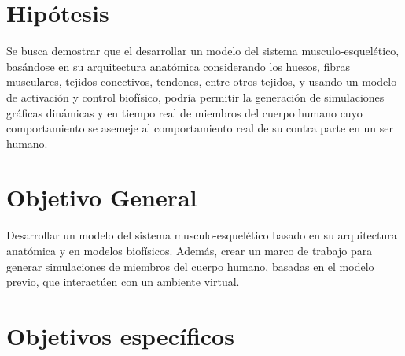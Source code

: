 \section{Hipótesis} %

\label{HipotesisObjetivos} %


Se busca demostrar que el desarrollar un modelo del sistema musculo-esquelético, basándose en su arquitectura anatómica considerando los huesos, fibras musculares, tejidos conectivos, tendones, entre otros tejidos, y usando un modelo de activación y control biofísico, podría permitir la generación de simulaciones gráficas dinámicas y en tiempo real de miembros del cuerpo humano cuyo comportamiento se asemeje al comportamiento real de su contra parte en un ser humano.


\section{Objetivo General}

Desarrollar un modelo del sistema musculo-esquelético basado en su arquitectura anatómica y en modelos biofísicos. Además, crear un marco de trabajo para generar simulaciones de miembros del cuerpo humano, basadas en el modelo previo, que interactúen con un ambiente virtual.


\section{Objetivos específicos}

